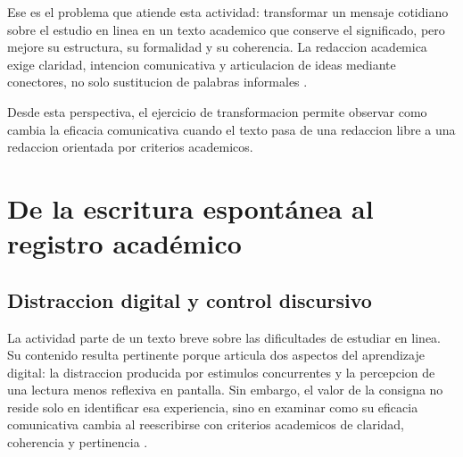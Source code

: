 \documentclass[
	spanish,
	letterpaper, oneside
]{article}
\begin{document}
Ese es el problema que atiende esta actividad: transformar un mensaje cotidiano sobre el estudio en linea en un texto academico que conserve el significado, pero mejore su estructura, su formalidad y su coherencia. La redaccion academica exige claridad, intencion comunicativa y articulacion de ideas mediante conectores, no solo sustitucion de palabras informales \citep{correaManualBasicoEscritura2018,vitoriaEscrituraAcademicaFormacion2019}.

Desde esta perspectiva, el ejercicio de transformacion permite observar como cambia la eficacia comunicativa cuando el texto pasa de una redaccion libre a una redaccion orientada por criterios academicos.

%
%
\section{De la escritura espontánea al registro académico}

\subsection{Distraccion digital y control discursivo}

La actividad parte de un texto breve sobre las dificultades de estudiar en linea. Su contenido resulta pertinente porque articula dos aspectos del aprendizaje digital: la distraccion producida por estimulos concurrentes y la percepcion de una lectura menos reflexiva en pantalla. Sin embargo, el valor de la consigna no reside solo en identificar esa experiencia, sino en examinar como su eficacia comunicativa cambia al reescribirse con criterios academicos de claridad, coherencia y pertinencia \citep{correaManualBasicoEscritura2018,vitoriaEscrituraAcademicaFormacion2019}.
\end{document}
